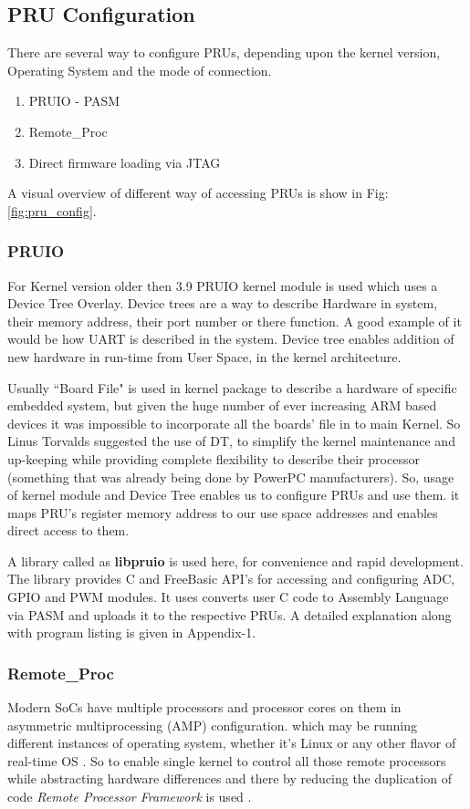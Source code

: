 \subsection{PRU Configuration}
There are several way to configure PRUs, depending upon the kernel version, Operating System and the mode of connection.
\begin{enumerate}
	\item PRUIO - PASM 
	\item Remote\_Proc
	\item Direct firmware loading via JTAG
\end{enumerate}

A visual overview of different way of accessing PRUs is show in Fig: \ref{fig:pru_config}.
\subsubsection{PRUIO}
 For Kernel version older then 3.9 PRUIO kernel module is used which uses a Device Tree Overlay. Device trees are a way to describe Hardware in system, their memory address, their port number or there function. A good example of it would be how UART is described in the system. Device tree enables addition of new hardware in run-time from User Space, in the kernel architecture. 
 
 Usually ``Board File" is used in kernel package to describe a hardware of specific embedded system, but given the huge number of ever increasing ARM based devices it was impossible to incorporate all the boards' file in to main Kernel. So Linus Torvalds \cite{DThist} suggested the use of DT, to simplify the kernel maintenance and up-keeping while providing complete flexibility to describe their processor (something that was already being done by PowerPC manufacturers). So, usage of kernel module and Device Tree enables us to configure PRUs and use them. it maps PRU's register memory address to our use space addresses and enables direct access to them. 
 
 A library  called as \textbf{libpruio} \cite{libpruio} is used here, for convenience and rapid development. The library provides C and FreeBasic API's for accessing and configuring ADC, GPIO and PWM modules. It uses converts user C code to Assembly Language via PASM and uploads it to the respective PRUs. A detailed explanation along with program listing is given in Appendix-1.
 
 \subsubsection{Remote\_Proc}
 Modern SoCs have multiple processors and processor cores on them in asymmetric multiprocessing (AMP) configuration. which may be running different instances  of operating system, whether it's Linux or any other flavor of real-time OS  . So to enable single kernel to control all those remote processors while abstracting hardware differences and there by reducing the duplication of code \textit{Remote Processor Framework} is used \cite{remoteproc}.
 
